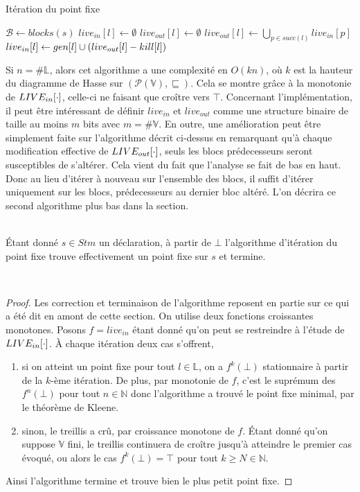 \documentclass[a4paper, 11pt]{article}
\begin{document}
\begin{algorithm}[H]
	\caption{Itération du point fixe}
	\begin{algorithmic}
		\State $\mathcal{B} \leftarrow blocks(s)$
		\State $live_{in}[l] \leftarrow \emptyset$
		\State $live_{out}[l] \leftarrow \emptyset$
		\EndFor
		\State $live_{out}[l] \leftarrow \bigcup\limits_{p\in succ(l)} live_{in}[p]$
		\State $live_{in}[l] \leftarrow gen[l] \cup (live_{out}[l] - kill[l])$
		\EndFor
		\EndWhile
	\end{algorithmic}
\end{algorithm}
Si $n = \#\mathbb{L}$, alors cet algorithme a une complexité en $O(kn)$, où $k$ est la hauteur du diagramme
de Hasse sur $(\mathcal{P}(\mathbb{V}), \sqsubseteq)$. Cela se montre grâce à la monotonie de $LIVE_{in}[\cdot]$, 
celle-ci ne faisant que croître vers $\top$.
Concernant l'implémentation, il peut être intéressant de définir $live_{in}$ et $live_{out}$ comme une structure binaire de taille au
moins $m$ bits avec $m = \#\mathbb{V}$.
En outre, une amélioration peut être simplement faite sur l'algorithme décrit ci-dessus en remarquant qu'à chaque 
modification effective de $LIVE_{out}[\cdot]$, seuls les blocs prédecesseurs seront susceptibles de s'altérer. Cela
vient du fait que l'analyse se fait de bas en haut. Donc
au lieu d'itérer à nouveau sur l'ensemble des blocs, il suffit d'itérer uniquement sur les blocs, prédecesseurs au dernier
bloc altéré. L'on décrira ce second algorithme plus bas dans la section.
\\
\\
\begin{lemma}
	Étant donné $s \in Stm$ un déclaration, à partir de $\bot$ l'algorithme d'itération du point fixe trouve effectivement
	un point fixe sur $s$ et termine.
\end{lemma}
\\
\begin{proof}
Les correction et terminaison de l'algorithme reposent en partie sur ce qui a été dit en amont de cette section.
On utilise deux fonctions croissantes monotones. Posons $f = live_{in}$ étant donné qu'on peut se restreindre
à l'étude de $LIVE_{in}[\cdot]$. À chaque itération deux cas s'offrent,
\begin{enumerate}
	\item si on atteint un point fixe pour tout $l \in \mathbb{L}$, on a $f^k(\bot)$ stationnaire
	à partir de la $k$-ème itération. De plus, par monotonie de $f$, c'est le suprémum des $f^n(\bot)$ pour tout $n \in \mathbb{N}$ donc
	l'algorithme a trouvé le point fixe minimal, par le théorème de Kleene.
	\item sinon, le treillis a crû, par croissance monotone de $f$. Étant donné qu'on suppose $\mathbb{V}$ fini, le treillis continuera
	de croître jusqu'à atteindre le premier cas évoqué, ou alors le cas $f^k(\bot) = \top$ pour tout $k \ge N \in \mathbb{N}$.
\end{enumerate}
Ainsi l'algorithme termine et trouve bien le plus petit point fixe.
\end{proof}
\end{document}
